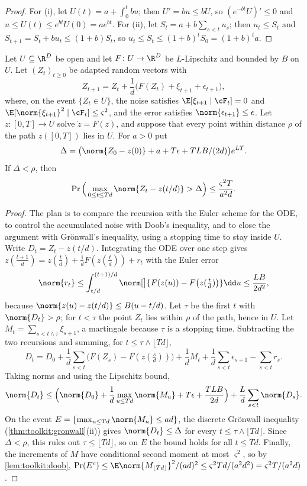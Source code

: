\begin{refsection}
\begin{proof}
For (i), let $U(t)=a+\int_0^tbu$; then $U'=bu\le bU$, so $(e^{-bt}U)'\le0$ and $u\le U(t)\le e^{bt}U(0)=ae^{bt}$. For (ii), let $S_t=a+b\sum_{s<t}u_s$; then $u_t\le S_t$ and $S_{t+1}=S_t+bu_t\le(1+b)S_t$, so $u_t\le S_t\le(1+b)^tS_0=(1+b)^ta$.
\end{proof}

\begin{theorem}\label{thm:toolkit:ode-method}
Let $U\subseteq\R^D$ be open and let $F\colon U\to\R^D$ be $L$-Lipschitz and bounded by $B$ on $U$. Let $(Z_t)_{t\ge0}$ be adapted random vectors with
\[
  Z_{t+1}=Z_t+\frac1d\big(F(Z_t)+\xi_{t+1}+\epsilon_{t+1}\big),
\]
where, on the event $\{Z_t\in U\}$, the noise satisfies $\E[\xi_{t+1}\mid\cF_t]=0$ and $\E[\norm{\xi_{t+1}}^2\mid\cF_t]\le\varsigma^2$, and the error satisfies $\norm{\epsilon_{t+1}}\le\epsilon$. Let $z\colon[0,T]\to U$ solve $\dot z=F(z)$, and suppose that every point within distance $\rho$ of the path $z([0,T])$ lies in $U$. For $a>0$ put
\[
  \Delta=\big(\norm{Z_0-z(0)}+a+T\epsilon+TLB/(2d)\big)e^{LT}.
\]
If $\Delta<\rho$, then
\[
  \Pr\Big(\max_{0\le t\le Td}\norm{Z_t-z(t/d)}>\Delta\Big)\le\frac{\varsigma^2T}{a^2d}.
\]
\end{theorem}

\begin{proof}
The plan is to compare the recursion with the Euler scheme for the ODE, to control the accumulated noise with Doob's inequality, and to close the argument with Gr\"onwall's inequality, using a stopping time to stay inside $U$. Write $D_t=Z_t-z(t/d)$. Integrating the ODE over one step gives $z(\frac{t+1}d)=z(\frac td)+\frac1dF(z(\frac td))+r_t$ with the Euler error
\[
  \norm{r_t}\le\int_{t/d}^{(t+1)/d}\norm[\big]{F(z(u))-F\big(z(\tfrac td)\big)}\dd u\le\frac{LB}{2d^2},
\]
because $\norm{z(u)-z(t/d)}\le B(u-t/d)$. Let $\tau$ be the first $t$ with $\norm{D_t}>\rho$; for $t<\tau$ the point $Z_t$ lies within $\rho$ of the path, hence in $U$. Let $M_t=\sum_{s<t\wedge\tau}\xi_{s+1}$, a martingale because $\tau$ is a stopping time. Subtracting the two recursions and summing, for $t\le\tau\wedge\lfloor Td\rfloor$,
\[
  D_t=D_0+\frac1d\sum_{s<t}\big(F(Z_s)-F(z(\tfrac sd))\big)+\frac1dM_t+\frac1d\sum_{s<t}\epsilon_{s+1}-\sum_{s<t}r_s .
\]
Taking norms and using the Lipschitz bound,
\[
  \norm{D_t}\le\Big(\norm{D_0}+\frac1d\max_{u\le Td}\norm{M_u}+T\epsilon+\frac{TLB}{2d}\Big)+\frac Ld\sum_{s<t}\norm{D_s}.
\]
On the event $E=\{\max_{u\le Td}\norm{M_u}\le ad\}$, the discrete Gr\"onwall inequality (\cref{thm:toolkit:gronwall}(ii)) gives $\norm{D_t}\le\Delta$ for every $t\le\tau\wedge\lfloor Td\rfloor$. Since $\Delta<\rho$, this rules out $\tau\le\lfloor Td\rfloor$, so on $E$ the bound holds for all $t\le Td$. Finally, the increments of $M$ have conditional second moment at most $\varsigma^2$, so by \cref{lem:toolkit:doob}, $\Pr(E^c)\le\E\norm{M_{\lfloor Td\rfloor}}^2/(ad)^2\le\varsigma^2Td/(a^2d^2)=\varsigma^2T/(a^2d)$.
\end{proof}


\end{refsection}
